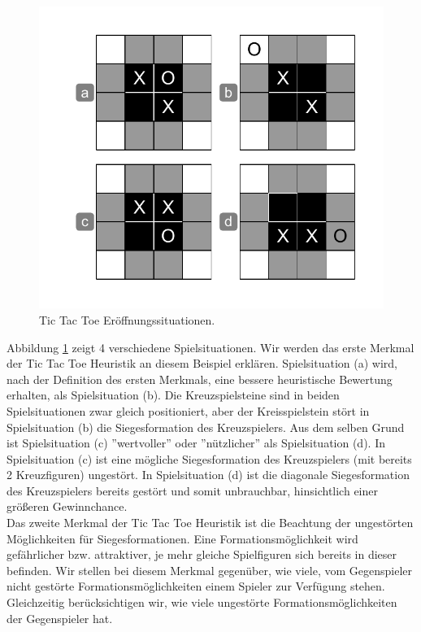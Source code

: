 \begin{figure}[!htbp]
  \centering
  \includegraphics[scale = 0.5]{inhalt/abbildungen/tictactoe_mid_control.pdf}
  \caption{Tic Tac Toe Eröffnungssituationen.}
  \label{fig:tictactoe_mid_control}
\end{figure}

Abbildung \ref{fig:tictactoe_mid_control} zeigt 4 verschiedene Spielsituationen. Wir werden das erste Merkmal der Tic Tac Toe Heuristik an diesem Beispiel erklären. Spielsituation (a) wird, nach der Definition des ersten Merkmals, eine bessere heuristische Bewertung erhalten, als Spielsituation (b). Die Kreuzspielsteine sind in beiden Spielsituationen zwar gleich positioniert, aber der Kreisspielstein stört in Spielsituation (b) die Siegesformation des Kreuzspielers. Aus dem selben Grund ist Spielsituation (c) ''wertvoller'' oder ''nützlicher'' als Spielsituation (d). In Spielsituation (c) ist eine mögliche Siegesformation des Kreuzspielers (mit bereits 2 Kreuzfiguren) ungestört. In Spielsituation (d) ist die diagonale Siegesformation des Kreuzspielers bereits gestört und somit unbrauchbar, hinsichtlich einer größeren Gewinnchance. \\

Das zweite Merkmal der Tic Tac Toe Heuristik ist die Beachtung der ungestörten Möglichkeiten für Siegesformationen. Eine Formationsmöglichkeit wird gefährlicher bzw. attraktiver, je mehr gleiche Spielfiguren sich bereits in dieser befinden. Wir stellen bei diesem Merkmal gegenüber, wie viele, vom Gegenspieler nicht gestörte Formationsmöglichkeiten  einem Spieler zur Verfügung stehen. Gleichzeitig berücksichtigen wir, wie viele ungestörte Formationsmöglichkeiten der Gegenspieler hat. \\
\newpage

